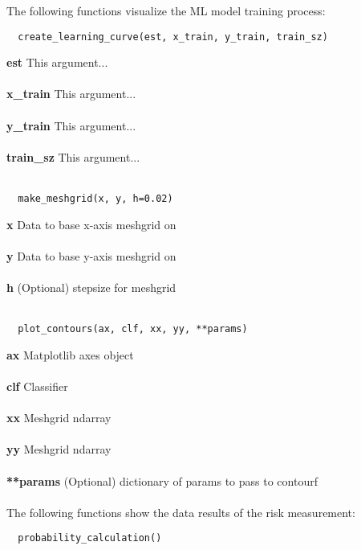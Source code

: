 The following functions visualize the ML model training process: \\

\begin{lstlisting}
  create_learning_curve(est, x_train, y_train, train_sz)
\end{lstlisting}

\noindent\textbf{est}
This argument... \\ \\
\textbf{x\_train}
This argument... \\ \\
\textbf{y\_train}
This argument... \\ \\
\textbf{train\_sz}
This argument... \\ \\

\begin{lstlisting}
  make_meshgrid(x, y, h=0.02)
\end{lstlisting}

\noindent\textbf{x}
Data to base x-axis meshgrid on \\ \\
\textbf{y}
Data to base y-axis meshgrid on \\ \\
\textbf{h}
(Optional) stepsize for meshgrid \\ \\

\begin{lstlisting}
  plot_contours(ax, clf, xx, yy, **params)
\end{lstlisting}

\noindent\textbf{ax}
Matplotlib axes object \\ \\
\textbf{clf}
Classifier \\ \\
\textbf{xx}
Meshgrid ndarray \\ \\
\textbf{yy}
Meshgrid ndarray \\ \\
\textbf{**params}
(Optional) dictionary of params to pass to contourf \\ \\

The following functions show the data results of the risk measurement: \\

\begin{lstlisting}
  probability_calculation()
\end{lstlisting}


